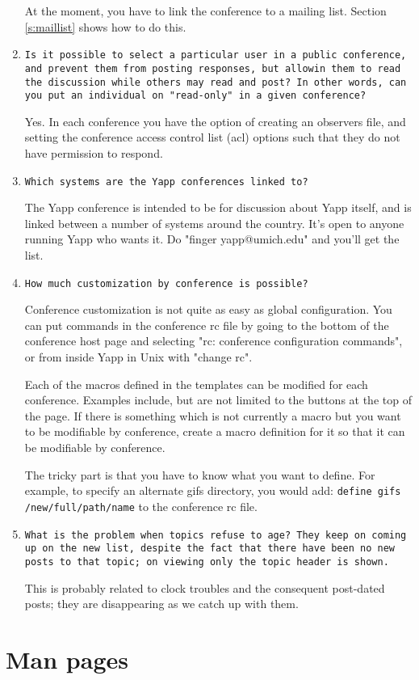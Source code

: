 \documentclass[twoside]{report}
\begin{document}
\begin{enumerate}
      At the moment, you have to link the conference to a mailing list.
      Section \ref{s:maillist} shows how to do this.

    \item {\tt Is it possible to select a particular user in a public
         conference, and prevent them from posting responses, but allowin 
         them to read the discussion while others may read and post?  
         In other words, can you put an individual on "read-only" in a given 
         conference? }

      Yes.  In each conference you have the option of creating an 
      observers file, and setting the conference access control list (acl)
      options such that they do not have permission to respond.

   \item {\tt  Which systems are the Yapp conferences linked to?}

      The Yapp conference is intended to be for discussion about Yapp itself,
      and is linked between a number of systems around the country.  It's
      open to anyone running Yapp who wants it.
      Do "finger yapp@umich.edu" and you'll get the list.

   \item {\tt How much customization by conference is possible?}

       Conference customization is not quite as easy as global configuration.
       You can put commands in the conference rc file by going to the 
       bottom of the conference host page and selecting "rc: conference 
       configuration commands", or from inside Yapp in Unix with "change rc".

      Each of the macros defined in the templates can be modified for
      each conference.  Examples include, but are not limited to the
      buttons at the top of the page.  If there is something which
      is not currently a macro but you want to be modifiable by
      conference, create a macro definition for it so that it
      can be modifiable by conference.

      The tricky part is that you have to know what you want to define.
      For example, to specify an alternate gifs directory, you would add:
      {\tt define gifs /new/full/path/name} to the conference rc file.

   \item {\tt What is the problem when topics refuse to age?  They keep on coming up 
        on the new list, despite the fact that there have been no new posts to 
        that topic; on viewing only the topic header is shown. }

      This is probably related to clock troubles and the consequent 
      post-dated posts; they are disappearing as we catch up with them.
    \end{enumerate}


\appendix

\chapter{Man pages} \label{a:manpages}
   
   \newpage
   


\end{document}
